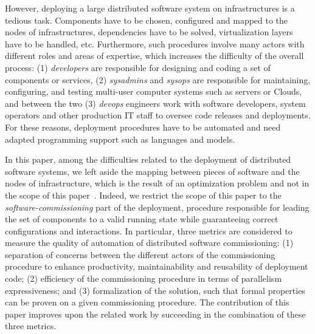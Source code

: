 However, deploying a large distributed software system on infrastructures is a tedious task. Components have to be chosen, configured and mapped to the nodes of infrastructures, dependencies have to be solved, virtualization layers have to be handled, etc. Furthermore, such procedures involve many actors with different roles and areas of expertise, which increases the difficulty of the overall process: (1) \emph{developers} are responsible for designing and coding a set of components or services, (2) \emph{sysadmins} and \emph{sysops} are responsible for maintaining, configuring, and testing multi-user computer systems such as servers or Clouds, and between the two (3) \emph{devops} engineers work with software developers, system operators and other production IT staff to oversee code releases and deployments. For these reasons, deployment procedures have to be automated and need adapted programming support such as languages and models.

In this paper, among the difficulties related to the deployment of distributed software systems, we left aside the mapping between pieces of software and the nodes of infrastructure, which is the result of an optimization problem and not in the scope of this paper~\cite{6409358, 10.1007/978-3-319-47677-3_15, cadorel:hal-02165835, ccgridemile, 10.5555/2432523.2432528}. Indeed, we restrict the scope of this paper to the \emph{software-commissioning} part of the deployment, \ie procedure responsible for leading the set of components to a valid running state while guaranteeing correct configurations and interactions.
In particular, three metrics are considered to measure the quality of automation of distributed software commissioning: (1) separation of concerns between the different actors of the commissioning procedure to enhance productivity, maintainability
and reusability of deployment code; (2) efficiency of the commissioning procedure in terms of parallelism expressiveness; and (3) formalization of the solution, such that formal properties can be proven on a given commissioning procedure. The contribution of this paper improves upon the related work by succeeding in the combination of these three metrics.
%

